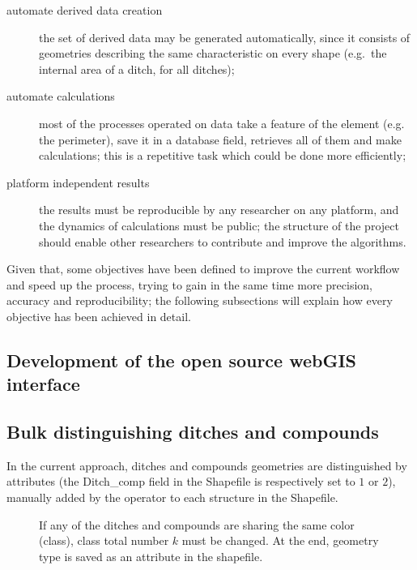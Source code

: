         \begin{description}
            \item[automate derived data creation] the set of derived data may be generated automatically, since it consists of geometries describing the same characteristic on every shape (e.g.\ the internal area of a ditch, for all ditches);
            \item[automate calculations] most of the processes operated on data take a feature of the element (e.g. the perimeter), save it in a database field, retrieves all of them and make calculations; this is a repetitive task which could be done more efficiently;
            \item[platform independent results] the results must be reproducible by any researcher on any platform, and the dynamics of calculations must be public; the structure of the project should enable other researchers to contribute and improve the algorithms.
        \end{description}

        Given that, some objectives have been defined to improve the current workflow and speed up the process, trying to gain in the same time more precision, accuracy and reproducibility; the following subsections will explain how every objective has been achieved in detail.

        \subsection{Development of the open source webGIS interface}
        \pagebreak

        \subsection{Bulk distinguishing ditches and compounds}
            In the current approach, ditches and compounds geometries are distinguished by attributes (the \textsf{Ditch\_comp} field in the Shapefile is respectively set to $1$ or $2$), manually added by the operator to each structure in the Shapefile.

            \begin{wrapfigure}{l}{0.5\textwidth}
                \centering
                \begin{tikzpicture}[x=1mm,y=1mm,scale=0.005]
                    
                \end{tikzpicture}
                \caption[Flow chart: the logic of bulk distinguishing ditches and compounds]{If any of the ditches and compounds are sharing the same color (class), class total number $k$ must be changed. At the end, geometry type is saved as an attribute in the shapefile.}
                \label{fig:flow-map}
            \end{wrapfigure}

